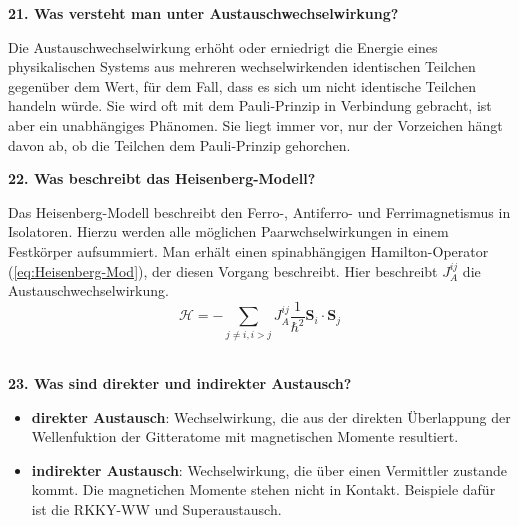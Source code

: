 \noindent\textbf{21. Was versteht man unter Austauschwechselwirkung?}\\
\begin{addmargin}[25pt]{0pt}
Die Austauschwechselwirkung erhöht oder erniedrigt die Energie eines physikalischen Systems aus mehreren wechselwirkenden identischen Teilchen gegenüber dem Wert, für dem Fall, dass es sich um nicht identische Teilchen handeln würde. Sie wird oft mit dem Pauli-Prinzip in Verbindung gebracht, ist aber ein unabhängiges Phänomen. Sie liegt immer vor, nur der Vorzeichen hängt davon ab, ob die Teilchen dem Pauli-Prinzip gehorchen.  \\
\end{addmargin}

\noindent\textbf{22. Was beschreibt das Heisenberg-Modell?}\\
\begin{addmargin}[25pt]{0pt}
Das Heisenberg-Modell beschreibt den Ferro-, Antiferro- und Ferrimagnetismus in Isolatoren. Hierzu werden alle möglichen Paarwchselwirkungen in einem Festkörper aufsummiert. Man erhält einen spinabhängigen Hamilton-Operator (\ref{eq:Heisenberg-Mod}), der diesen Vorgang beschreibt. Hier beschreibt $J_{A}^{ij}$ die Austauschwechselwirkung.
\begin{equation}
    \mathcal{H} = -\sum_{j\neq i, i>j} J^{ij}_{A} \frac{1}{\hbar^2} \boldsymbol{S}_{i} \cdot \boldsymbol{S}_{j}
    \label{eq:Heisenberg-Mod}
\end{equation}\\
\end{addmargin}

\noindent\textbf{23. Was sind direkter und indirekter Austausch?}\\
\begin{itemize}
    \item \textbf{direkter Austausch}: Wechselwirkung, die aus der direkten Überlappung der Wellenfuktion der Gitteratome mit magnetischen Momente resultiert.
    \item \textbf{indirekter Austausch}: Wechselwirkung, die über einen Vermittler zustande kommt. Die magnetichen Momente stehen nicht in Kontakt. Beispiele dafür ist die RKKY-WW und Superaustausch.
\end{itemize} 

